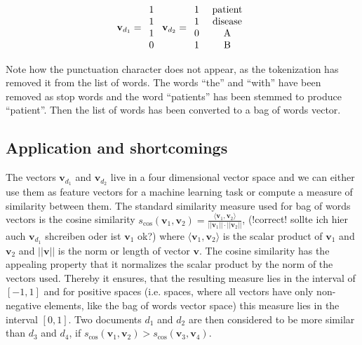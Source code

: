 \[
\textbf{v}_{d_1}=\begin{array}{c}
1\\
1\\
1\\
0
\end{array}\ \textbf{v}_{d_2}=\begin{array}{c}
1\\
1\\
0\\
1
\end{array}\ \begin{array}{c}
\rm{patient}\\
\rm{disease}\\
\rm{A}\\
\rm{B}\\
\end{array}
\]

Note how the punctuation character does not appear, as the tokenization has removed it from the list of words. The words ``the'' and ``with'' have been removed as stop words and the word ``patients'' has been stemmed to produce ``patient''. Then the list of words has been converted to a bag of words vector.

\subsection*{Application and shortcomings}
The vectors $\textbf{v}_{d_1}$ and $\textbf{v}_{d_2}$ live in a four dimensional vector space and we can either use them as feature vectors for a machine learning task or compute a measure of similarity between them. The standard similarity measure used for bag of words vectors is the cosine similarity $s_{\cos}(\textbf{v}_1, \textbf{v}_2)=\frac{\langle\textbf{v}_1,\textbf{v}_2\rangle}{||\textbf{v}_1||\cdot ||\textbf{v}_2||}$, (!correct! sollte ich hier auch $\textbf{v}_{d_1}$ shcreiben oder ist $\textbf{v}_1$ ok?) where $\langle\textbf{v}_1,\textbf{v}_2\rangle$ is the scalar product of $\textbf{v}_1$ and $\textbf{v}_2$ and $||\textbf{v}||$ is the norm or length of vector $\textbf{v}$. The cosine similarity has the appealing property that it normalizes the scalar product by the norm of the vectors used. Thereby it ensures, that the resulting measure lies in the interval of $[-1,1]$ and for positive spaces (i.e. spaces, where all vectors have only non-negative elements, like the bag of words vector space) this measure lies in the interval $[0,1]$. Two documents $d_{1}$ and $d_{2}$ are then considered to be more similar than $d_{3}$ and $d_{4}$, if $s_{\cos}(\textbf{v}_1, \textbf{v}_2) > s_{\cos}(\textbf{v}_3, \textbf{v}_4)$.

